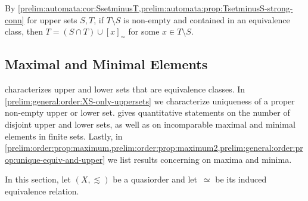 By \cref{prelim:automata:cor:SsetminusT,prelim:automata:prop:TsetminusS-strong-conn}
for upper sets $S,T$, if $T \setminus S$ is non-empty and contained in an equivalence class,
then $T = (S \cap T) \cup [x]_{\simeq}$ for some $x \in T \setminus S$.


\subsection{Maximal and Minimal Elements}
\label{prelim:gen:order:sec:maximal-minimal}

characterizes upper and lower sets that are equivalence classes.
In \cref{prelim:general:order:XS-only-uppersets}
we characterize uniqueness of a proper non-empty upper or lower set.
gives quantitative statements on the number of disjoint upper and lower sets,
as well as on incomparable maximal and minimal elements in finite sets.
Lastly, in \cref{prelim:order:prop:maximum,prelim:order:prop:maximum2,prelim:general:order:prop:unique-equiv-and-upper}
we list results concerning on maxima and minima.

In this section, let $(X, \lesssim)$ be a quasiorder and let~$\simeq$ be its induced equivalence relation.

